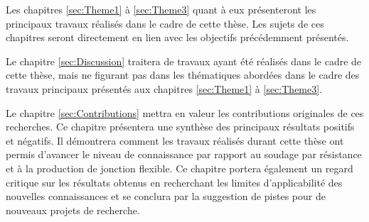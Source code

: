 Les chapitres \ref{sec:Theme1} à \ref{sec:Theme3} quant à eux présenteront les principaux travaux réalisés dans le cadre de cette thèse. 
Les sujets de ces chapitres seront directement en lien avec les objectifs précédemment présentés. 

Le chapitre \ref{sec:Discussion} traitera de travaux ayant été réalisés dans le cadre de cette thèse, mais ne figurant pas dans les thématiques abordées dans le cadre des travaux principaux présentés aux chapitres \ref{sec:Theme1} à \ref{sec:Theme3}.  

Le chapitre \ref{sec:Contributions} mettra en valeur les contributions originales de ces recherches. 
Ce chapitre présentera une synthèse des principaux résultats positifs et négatifs. 
Il démontrera comment les travaux réalisés durant cette thèse ont permis d'avancer le niveau de connaissance par rapport au soudage par résistance et à la production de jonction flexible. 
Ce chapitre portera également un regard critique sur les résultats obtenus en recherchant les limites d'applicabilité des nouvelles connaissances et se conclura par la suggestion de pistes pour de nouveaux projets de recherche. 


